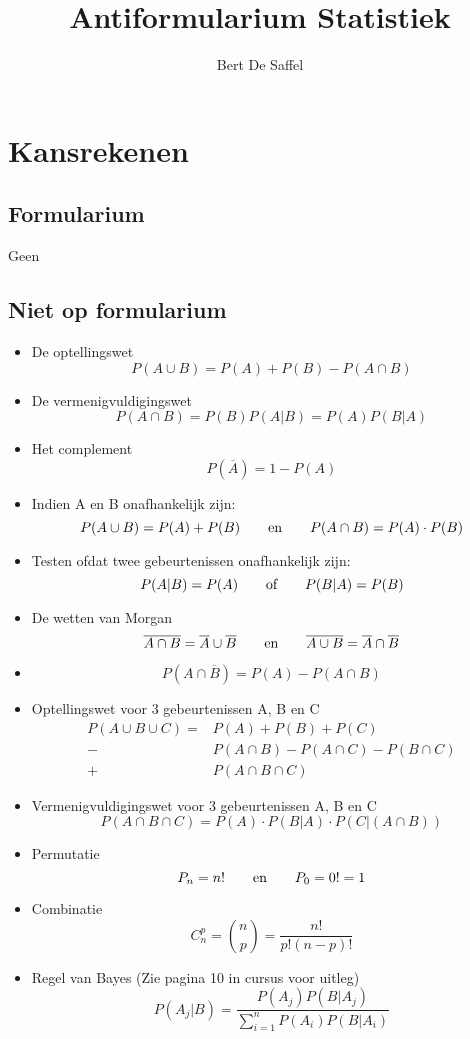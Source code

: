 \documentclass[12pt]{report}
\title{Antiformularium Statistiek}
\author{Bert De Saffel}
\date{}
\begin{document}
 \maketitle
 \tableofcontents
 \chapter{Kansrekenen}
 \section{Formularium}
 Geen
 \section{Niet op formularium}
 \begin{itemize}
  \item De optellingswet
    $$P(A \cup B) = P(A) + P(B) - P(A \cap B)$$
  \item De vermenigvuldigingswet
    $$P(A \cap B) = P(B)P(A|B) = P(A)P(B|A)$$
  \item Het complement
    $$P(\overline{A}) = 1 - P(A)$$
  \item Indien A en B onafhankelijk zijn:
    $$P(A \cup B) = P(A) + P(B)\qquad\hbox{en}\qquad P(A \cap B) = P(A) \cdot P(B)$$
  \item Testen ofdat twee gebeurtenissen onafhankelijk zijn:
    $$P(A|B) = P(A)\qquad\hbox{of}\qquad P(B|A) = P(B)$$
  \item De wetten van Morgan
    $$\overline{A \cap B} = \overline{A} \cup \overline{B}\qquad\hbox{en}\qquad \overline{A \cup B} = \overline{A} \cap \overline{B}$$
  \item $$P(A \cap \overline{B}) = P(A) -  P(A \cap B)$$
  \item Optellingswet voor 3 gebeurtenissen A, B en C
    \begin{equation*}
        \begin{split}
            P(A \cup B \cup C) = & P(A) + P(B) + P(C) \\ 
             - & P(A \cap B) - P(A \cap C) - P(B \cap C) \\
             + & P(A \cap B \cap C)      
        \end{split}
    \end{equation*}
  \item Vermenigvuldigingswet voor 3 gebeurtenissen A, B en C
    $$P(A \cap B \cap C) = P(A)\cdot P(B|A)\cdot P(C|(A \cap B))$$
  \item Permutatie
    $$P_n = n! \qquad\hbox{en}\qquad P_0 = 0! = 1$$
  \item Combinatie
    $$C_n^p = \binom np = \frac{n!}{p!(n - p)!}$$
  \item Regel van Bayes (Zie pagina 10 in cursus voor uitleg)
    $$P(A_j|B) = \frac{P(A_j)P(B|A_j)}{\sum_{i=1}^{n}P(A_i)P(B|A_i)}$$
 \end{itemize}
\end{document}

